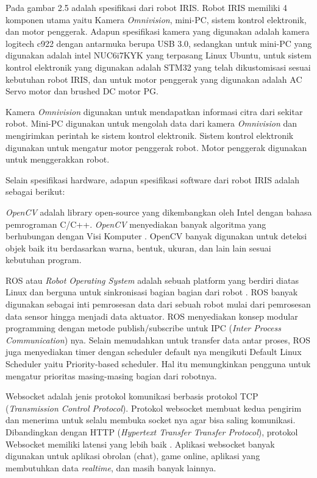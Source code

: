 Pada gambar 2.5 adalah spesifikasi dari robot IRIS. Robot IRIS memiliki 4 komponen utama yaitu Kamera \emph{Omnivision}, mini-PC, sistem kontrol elektronik, dan motor penggerak. 
Adapun spesifikasi kamera yang digunakan adalah kamera logitech c922 dengan antarmuka berupa USB 3.0, sedangkan untuk mini-PC yang digunakan adalah intel NUC6i7KYK yang terpasang Linux Ubuntu, untuk sistem kontrol elektronik yang digunakan adalah STM32 yang telah dikustomisasi sesuai kebutuhan robot IRIS, dan untuk motor penggerak yang digunakan adalah AC Servo motor dan brushed DC motor PG.

Kamera \emph{Omnivision} digunakan untuk mendapatkan informasi citra dari sekitar robot. Mini-PC digunakan untuk mengolah data dari kamera \emph{Omnivision} dan mengirimkan perintah ke sistem kontrol elektronik. Sistem kontrol elektronik digunakan untuk mengatur motor penggerak robot. Motor penggerak digunakan untuk menggerakkan robot. 

Selain spesifikasi hardware, adapun spesifikasi software dari robot IRIS adalah sebagai berikut: 

\emph{OpenCV} adalah library open-source yang dikembangkan oleh 
Intel dengan bahasa pemrograman C/C++. 
\emph{OpenCV} menyediakan banyak algoritma yang berhubungan dengan Visi 
Komputer \Parencite{ref_opencv}. OpenCV banyak digunakan untuk deteksi 
objek baik itu berdasarkan warna, bentuk, ukuran, dan lain lain 
sesuai kebutuhan program. 

ROS atau \emph{Robot Operating System} adalah sebuah platform yang berdiri 
diatas 
Linux dan berguna untuk sinkronisasi bagian bagian dari 
robot \Parencite{ref_ros}. ROS banyak digunakan sebagai inti 
pemrosesan data dari sebuah robot mulai dari pemrosesan data sensor 
hingga menjadi data aktuator. ROS menyediakan konsep modular programming 
dengan metode publish/subscribe untuk IPC (\emph{Inter Process Communication}) nya. Selain memudahkan untuk 
transfer data antar proses, ROS juga menyediakan timer dengan scheduler 
default nya mengikuti Default Linux Scheduler yaitu Priority-based scheduler. 
Hal itu memungkinkan pengguna untuk mengatur prioritas masing-masing bagian 
dari robotnya. 

Websocket adalah jenis protokol komunikasi berbasis protokol TCP (\emph{Transmission Control Protocol}). 
Protokol websocket membuat kedua pengirim dan menerima untuk selalu 
membuka socket nya agar bisa saling komunikasi. 
Dibandingkan dengan HTTP (\emph{Hypertext Transfer Transfer Protocol}), 
protokol Websocket memiliki 
latensi yang lebih baik \Parencite{ref_websocket}. Aplikasi 
websocket banyak digunakan untuk aplikasi obrolan (chat), game online,
 aplikasi yang membutuhkan data \emph{realtime}, dan masih banyak lainnya. 


